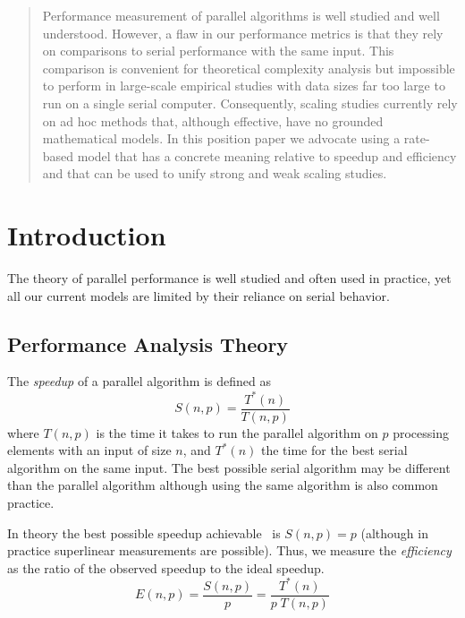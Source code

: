 \documentclass[conference]{IEEEtran}
\newcommand*{\lcite}[1]{~\cite{#1}}
\newcommand*{\keyterm}[1]{\emph{#1}}
\begin{document}
\maketitle


\begin{abstract}
Performance measurement of parallel algorithms is well studied and well
understood. However, a flaw in our performance metrics is that they rely on
comparisons to serial performance with the same input. This comparison is
convenient for theoretical complexity analysis but impossible to perform in
large-scale empirical studies with data sizes far too large to run on a
single serial computer.  Consequently, scaling studies currently rely on ad
hoc methods that, although effective, have no grounded mathematical models.
In this position paper we advocate using a rate-based model that has a
concrete meaning relative to speedup and efficiency and that can be used to
unify strong and weak scaling studies.
\end{abstract}

\section{Introduction}

\noindent
The theory of parallel performance is well studied and often used in
practice, yet all our current models are limited by their reliance on
serial behavior.

\subsection{Performance Analysis Theory}

\noindent
The \keyterm{speedup} of a parallel algorithm is defined as
\begin{equation}
  S(n,p) = \frac{T^*(n)}{T(n,p)}
  \label{eq:Speedup}
\end{equation}
where $T(n,p)$ is the time it takes to run the parallel algorithm on $p$
processing elements with an input of size $n$, and $T^*(n)$ the time for the
best serial algorithm on the same input. The best possible serial algorithm
may be different than the parallel algorithm although using the same
algorithm is also common practice.

In theory the best possible speedup achievable\lcite{Faber1986} is $S(n,p)
= p$ (although in practice superlinear measurements are possible). Thus, we
measure the \keyterm{efficiency} as the ratio of the observed speedup to
the ideal speedup.
\begin{equation}
  E(n,p) = \frac{S(n,p)}{p} = \frac{T^*(n)}{p \; T(n,p)}
  \label{eq:Efficiency}
\end{equation}
\end{document}
